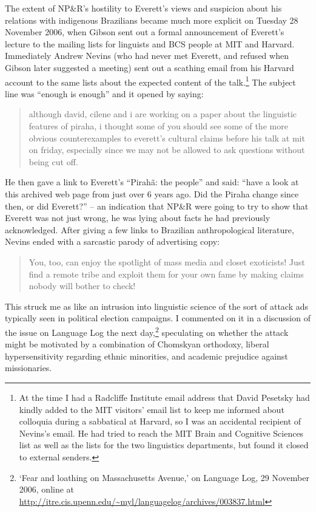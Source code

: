 \documentclass[output=paper,colorlinks,citecolor=brown
]{langscibook}
\begin{document}
The extent of NP\&R's hostility to Everett's views and suspicion about
his relations with indigenous Brazilians became much more explicit
on Tuesday 28 November 2006, when Gibson sent out a formal announcement
of Everett's lecture to the mailing lists for linguists and BCS people
at MIT and Harvard. Immediately Andrew Nevins (who had never met
Everett, and refused when Gibson later suggested a meeting) sent out
a scathing email from his Harvard account to the same lists about the
expected content of the talk.\footnote{\label{recipient}
   At the time I had a Radcliffe Institute email address that David
   Pesetsky had kindly added to the MIT visitors' email list to keep
   me informed about colloquia during a sabbatical at Harvard, so I
   was an accidental recipient of Nevins's email. He had tried to reach
   the MIT Brain and Cognitive Sciences list as well as the lists for
   the two linguistics departments, but found it closed to external
   senders.}
The subject line was ``enough is enough'' and it opened by saying:
\begin{quote}
although david, cilene and i are working on a paper about the
linguistic features of piraha, i thought some of you should see
some of the more obvious counterexamples to everett's cultural
claims before his talk at mit on friday, especially since we may
not be allowed to ask questions without being cut off.
\end{quote}
He then gave a link to Everett's ``Pirah{\~a}: the people'' and said:
``have a look at this archived web page from just over 6 years ago.
Did the Piraha change since then, or did Everett?'' -- an indication
that NP\&R were going to try to show that Everett was not just wrong,
he was lying about facts he had previously acknowledged. After giving
a few links to Brazilian anthropological literature,  Nevins ended
with a sarcastic parody of advertising copy:
\begin{quote}
You, too, can enjoy the spotlight of mass media
and closet exoticists! Just find a remote tribe and exploit them
for your own fame by making claims nobody will bother to check!
\end{quote}

This struck me as like an intrusion into linguistic science of the
sort of attack ads typically seen in political election campaigns.
I commented on it in a discussion of the issue on Language Log
the next day,\footnote{\label{languagelog}
   `Fear and loathing on Massachusetts Avenue,' on Language Log,
   29 November 2006, online at
   \url{http://itre.cis.upenn.edu/~myl/languagelog/archives/003837.html}}
speculating on whether the attack might be motivated by a combination of
Chomskyan orthodoxy, liberal hypersensitivity regarding ethnic minorities,
and academic prejudice against missionaries.
\end{document}
